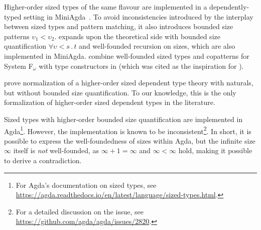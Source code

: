 Higher-order sized types of the same flavour are implemented in a dependently-typed setting in MiniAgda~\citep{miniagda}.
To avoid inconsistencies introduced by the interplay between sized types and pattern matching,
it also introduces bounded size patterns $\upsilon_1 < \upsilon_2$.
\citet{flationary} expands upon the theoretical side with bounded size quantification $\forall \upsilon \mathrel{<} s\mathpunct{.} t$ and well-founded recursion on sizes,
which are also implemented in MiniAgda.
\citet{f-omega-cop} combine well-founded sized types and copatterns for System F$_\omega$ with \corecursive type constructors in \Fomegacop (which was cited as the inspiration for \CIChatsub).

\cite{nbe} prove normalization of a higher-order sized dependent type theory with naturals, but without bounded size quantification.
To our knowledge, this is the only formalization of higher-order sized dependent types in the literature.

Sized types with higher-order bounded size quantification are implemented in Agda\footnote{For Agda's documentation on sized types, see \url{https://agda.readthedocs.io/en/latest/language/sized-types.html}.}.
However, the implementation is known to be inconsistent\footnote{For a detailed discussion on the issue, see \url{https://github.com/agda/agda/issues/2820}.}.
In short, it is possible to express the well-foundedness of sizes within Agda,
but the infinite size $\infty$ itself is \emph{not} well-founded,
as $\infty + 1 = \infty$ and $\infty < \infty$ hold,
making it possible to derive a contradiction.

